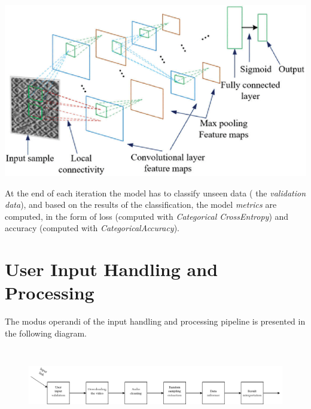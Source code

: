 \begin{center}
	\centering
	\includegraphics[width = 5.5in]{images/genericcnn.png}
	\centerline{}
\label{genarch}
\end{center}

At the end of each iteration the model has to classify unseen data ( the \textit{validation data}), and based on the results of
the classification, the model \textit{metrics} are computed, in the form of loss (computed with \textit{Categorical CrossEntropy})
and accuracy (computed with \textit{CategoricalAccuracy}).


\section{User Input Handling and Processing}

The modus operandi of the input handling and processing pipeline is presented in the following diagram.

\begin{figure}[H]
	\centering
	\includegraphics[width = 6.5in,height=1.3in]{images/datapipe.png}
	\centerline{}
\label{mo}
\end{figure}

